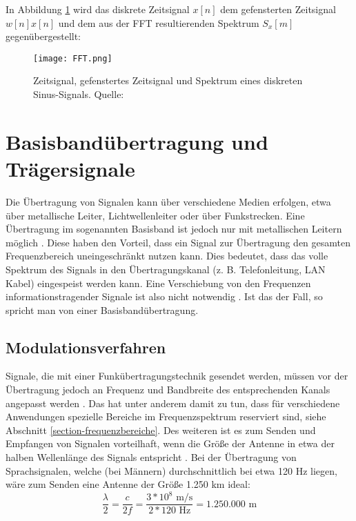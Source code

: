 In Abbildung \ref{fft} wird das diskrete Zeitsignal \(x[n]\) dem gefensterten Zeitsignal \(w[n]x[n]\) und dem aus der FFT resultierenden Spektrum \(S_x[m]\) gegenübergestellt:
\begin{figure}[ht]
	\centering
	\texttt{[image: FFT.png]}
	\caption[Zeitsignal, gefenstertes Zeitsignal und Spektrum eines diskreten Sinus-Signals]{Zeitsignal, gefenstertes Zeitsignal und Spektrum eines diskreten Sinus-Signals. Quelle: \cite[Heuberger, e. a., S. 16]{Heuberger:2017}} 
	\label{fft}
\end{figure}




\section{Basisbandübertragung und Trägersignale}
Die Übertragung von Signalen kann über verschiedene Medien erfolgen, etwa über metallische Leiter, Lichtwellenleiter oder über Funkstrecken. Eine Übertragung im sogenannten Basisband ist jedoch nur mit metallischen Leitern möglich \cite[vgl. Read, S. 149]{Read:2004}. Diese haben den Vorteil, dass ein Signal zur Übertragung den gesamten Frequenzbereich uneingeschränkt nutzen kann. Dies bedeutet, dass das volle Spektrum des Signals in den Übertragungskanal (z. B. Telefonleitung, LAN Kabel) eingespeist werden kann. Eine Verschiebung von den Frequenzen informationstragender Signale ist also nicht notwendig \cite[vgl. Werner, S. 158]{Werner:2006}. Ist das der Fall, so spricht man von einer Basisbandübertragung.\newline


\subsection{Modulationsverfahren}
Signale, die mit einer Funkübertragungstechnik gesendet werden, müssen vor der Übertragung jedoch an Frequenz und Bandbreite des entsprechenden Kanals angepasst werden \cite[vgl. Read, S. 24]{Read:2004}. 
Das hat unter anderem damit zu tun, dass für verschiedene Anwendungen spezielle Bereiche im Frequenzspektrum reserviert sind, siehe Abschnitt \ref{section-frequenzbereiche}.
Des weiteren ist es zum Senden und Empfangen von Signalen vorteilhaft, wenn die Größe der Antenne in etwa der halben Wellenlänge des Signals entspricht \cite[vgl. Kark, S. 4]{Kark:2017}.
Bei der Übertragung von Sprachsignalen, welche (bei Männern) durchschnittlich bei etwa 120 Hz liegen, wäre zum Senden eine Antenne der Größe 1.250 km ideal:
\[ \frac{\lambda}{2} = \frac{c}{2f} = \frac{3*10^8 \text{ m/s}}{2*120 \text{ Hz}} = 1.250.000 \text{ m}\]

